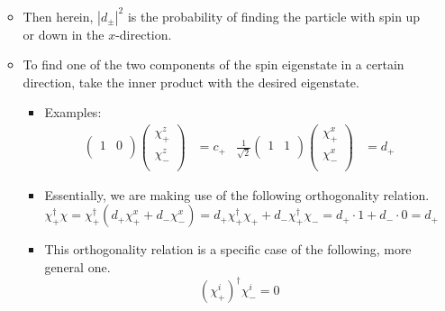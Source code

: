 \documentclass[../notes.tex]{subfiles}
\begin{document}
\begin{itemize}
\begin{itemize}
\begin{equation*}
        \end{equation*}
        \item Then herein, $|d_\pm|^2$ is the probability of finding the particle with spin up or down in the $x$-direction.
        \item To find one of the two components of the spin eigenstate in a certain direction, take the inner product with the desired eigenstate.
        \begin{itemize}
            \item Examples:
            \begin{align*}
                \begin{pmatrix}
                    1 & 0\\
                \end{pmatrix}
                \begin{pmatrix}
                    \chi_+^z\\
                    \chi_-^z\\
                \end{pmatrix}
                &= c_+&
                \frac{1}{\sqrt{2}}
                \begin{pmatrix}
                    1 & 1\\
                \end{pmatrix}
                \begin{pmatrix}
                    \chi_+^x\\
                    \chi_-^x\\
                \end{pmatrix}
                &= d_+
            \end{align*}
            \item Essentially, we are making use of the following orthogonality relation.
            \begin{equation*}
                \chi_+^\dagger\chi = \chi_+^\dagger(d_+\chi_+^x+d_-\chi_-^x)
                = d_+\chi_+^\dagger\chi_++d_-\chi_+^\dagger\chi_-
                = d_+\cdot 1+d_-\cdot 0
                = d_+
            \end{equation*}
            \item This orthogonality relation is a specific case of the following, more general one.
            \begin{equation*}
                (\chi_+^i)^\dagger\chi_-^i = 0
            \end{equation*}
        \end{itemize}

\end{itemize}
\end{itemize}
\end{document}
